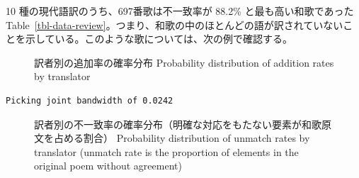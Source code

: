 \documentclass[
  letterpaper,
  DIV=11,
  numbers=noendperiod]{scrartcl}
\begin{document}
10 種の現代語訳のうち、697番歌は不一致率が 88.2\% と最も高い和歌であった
Table~\ref{tbl-data-review}。つまり、和歌の中のほとんどの語が訳されていないことを示している。このような歌については、次の例で確認する。

\begin{figure}


\caption[訳者別の追加率の確率分布]{\label{fig-data}訳者別の追加率の確率分布
Probability distribution of addition rates by translator}

\end{figure}%

\begin{verbatim}
Picking joint bandwidth of 0.0242
\end{verbatim}

\begin{figure}


\caption[不一致率（明確な対応をもたない要素が和歌原文を占める割合）の概要]{\label{fig-unmatch-rate}訳者別の不一致率の確率分布（明確な対応をもたない要素が和歌原文を占める割合）
Probability distribution of unmatch rates by translator (unmatch rate is
the proportion of elements in the original poem without agreement)}

\end{figure}%
\end{document}
